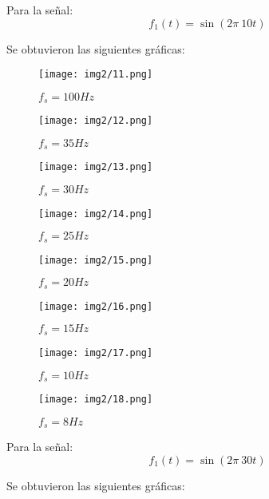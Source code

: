 
Para la señal:
\begin{equation}
	f_1(t)= \sin (2\pi \ 10 t)
\end{equation}

Se obtuvieron las siguientes gráficas:

\begin{figure}[!htbp]
	\centering
	\texttt{[image: img2/11.png]}
	\caption{$f_s= 100 Hz$}
\end{figure}

\begin{figure}[!htbp]
	\centering
	\texttt{[image: img2/12.png]}
	\caption{$f_s= 35 Hz$}
\end{figure}

\newpage

\begin{figure}[!htbp]
	\centering
	\texttt{[image: img2/13.png]}
	\caption{$f_s= 30 Hz$}
\end{figure}

\begin{figure}[!htbp]
	\centering
	\texttt{[image: img2/14.png]}
	\caption{$f_s= 25 Hz$}
\end{figure}
 
 \newpage
 
 \begin{figure}[!htbp]
 	\centering
 	\texttt{[image: img2/15.png]}
 	\caption{$f_s= 20 Hz$}
 \end{figure}
 
 \begin{figure}[!htbp]
 	\centering
 	\texttt{[image: img2/16.png]}
 	\caption{$f_s= 15 Hz$}
 \end{figure}

\newpage

\begin{figure}[!htbp]
	\centering
	\texttt{[image: img2/17.png]}
	\caption{$f_s= 10 Hz$}
\end{figure}

\begin{figure}[!htbp]
	\centering
	\texttt{[image: img2/18.png]}
	\caption{$f_s= 8 Hz$}
\end{figure}


\newpage

Para la señal:
\begin{equation}
	f_1(t)= \sin (2\pi \ 30 t)
\end{equation}

Se obtuvieron las siguientes gráficas:

